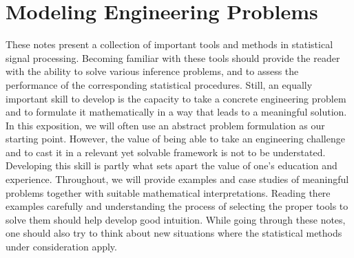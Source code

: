 \section{Modeling Engineering Problems}

These notes present a collection of important tools and methods in statistical signal processing.
Becoming familiar with these tools should provide the reader with the ability to solve various inference problems, and to assess the performance of the corresponding statistical procedures.
Still, an equally important skill to develop is the capacity to take a concrete engineering problem and to formulate it mathematically in a way that leads to a meaningful solution.
In this exposition, we will often use an abstract problem formulation as our starting point.
However, the value of being able to take an engineering challenge and to cast it in a relevant yet solvable framework is not to be understated.
Developing this skill is partly what sets apart the value of one's education and experience.
Throughout, we will provide examples and case studies of meaningful problems together with suitable mathematical interpretations.
Reading there examples carefully and understanding the process of selecting the proper tools to solve them should help develop good intuition.
While going through these notes, one should also try to think about new situations where the statistical methods under consideration apply.



%
%

%




